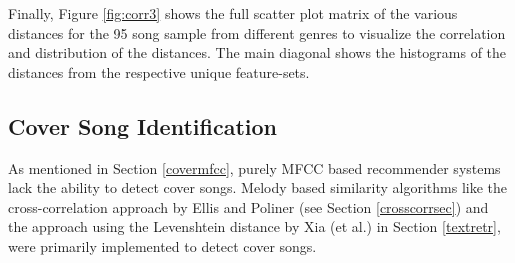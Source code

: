 \noindent Finally, Figure \ref{fig:corr3} shows the full scatter plot matrix of the various distances for the 95 song sample from different genres to visualize the correlation and distribution of the distances. The main diagonal shows the histograms of the distances from the respective unique feature-sets.

\begin{figure}[htbp]
	\centering
\end{figure}
\FloatBarrier


\subsection{Cover Song Identification}\label{covsongid}

As mentioned in Section \ref{covermfcc}, purely MFCC based recommender systems lack the ability to detect cover songs. Melody based similarity algorithms like the cross-correlation approach by Ellis and Poliner (see Section \ref{crosscorrsec}) and the approach using the Levenshtein distance by Xia (et al.) in Section \ref{textretr}, were primarily implemented to detect cover songs. 

